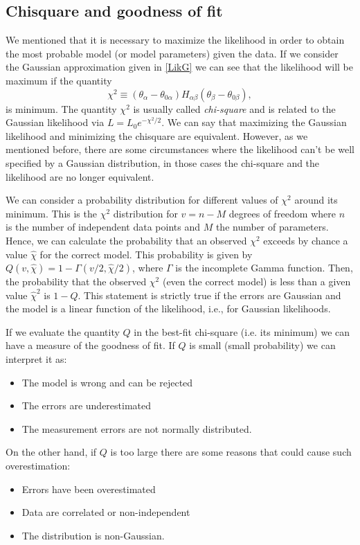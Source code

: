 \documentclass[onecolumn,           %
               showpacs,            %
               preprintnumbers,     %
               aps,                 %
               letterpaper,             %
               superscriptaddress,      %
               nofootinbib,         %
               tightenlines,        %
               floats,floatfix      %
               ,usenatbib,
               ]{revtex4-1}
\begin{document}
\subsection{Chisquare and goodness of fit}

We mentioned that it is necessary to maximize the likelihood in order to obtain the most probable model (or model parameters) given the data. If we consider the Gaussian approximation given in \eqref{LikG} we can see that the likelihood will be maximum if the quantity
\begin{equation}\label{chi2}
\chi^2\equiv(\theta_\alpha-\theta_{0\alpha})H_{\alpha\beta}(\theta_\beta-\theta_{0\beta}),
\end{equation}
is minimum. The quantity $\chi^2$ is usually called \textit{chi-square} and is related to the Gaussian likelihood via $L=L_0e^{-\chi^2/2}$. We can say that maximizing the Gaussian likelihood and minimizing the chisquare are equivalent. However, as we mentioned before, there are some circumstances where the likelihood can't be well specified by a Gaussian distribution, in those cases the chi-square and the likelihood are no longer equivalent. 

We can consider a probability distribution for different values of $\chi^2$ around its minimum. This is the $\chi^2$ distribution for $v=n-M$ degrees of freedom where $n$ is the number of independent data points and $M$ the number of parameters. Hence, we can calculate the probability that an observed $\chi^2$ exceeds by chance a value $\hat \chi$ for the correct model. This probability is given by \cite{NR} $Q(v,\hat\chi)=1-\Gamma(v/2,\hat\chi/2)$, where $\Gamma$ is the incomplete Gamma function. Then, the probability that the observed $\chi^2$ (even the correct model) is less than a given value $\hat\chi^2$ is $1-Q$. This statement is strictly true if the errors are Gaussian and the model is a linear function of the likelihood, i.e., for Gaussian likelihoods.

If we evaluate the quantity $Q$ in the best-fit chi-square (i.e. its minimum) we can have a measure of the goodness of fit. If $Q$ is small (small probability) we can interpret it as:
\begin{itemize}
\item The model is wrong and can be rejected
\item The errors are underestimated 
\item The measurement errors are not normally distributed.
\end{itemize}
On the other hand, if $Q$ is too large there are some reasons that could cause such overestimation:
\begin{itemize}
\item Errors have been overestimated
\item Data are correlated or non-independent
\item The distribution is non-Gaussian.
\end{itemize}
\end{document}
